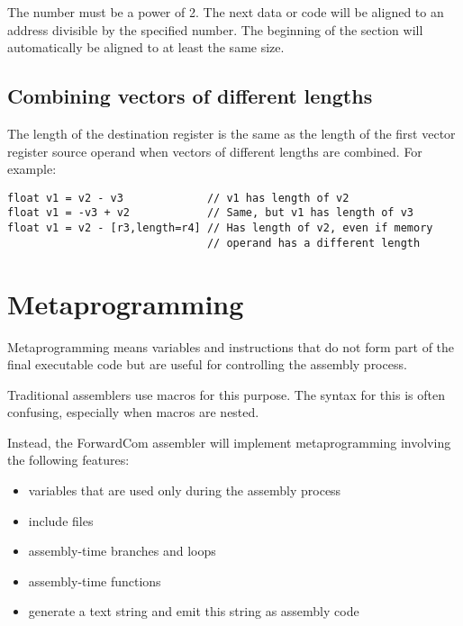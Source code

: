 \documentclass[forwardcom.tex]{subfiles}
\begin{document}
The number must be a power of 2. The next data or code will be aligned to an address divisible by the specified number. The beginning of the section will automatically be aligned to at least the same size.
\vspace{2mm}


\subsection{Combining vectors of different lengths} \label{vectorsDifferentLengths}

The length of the destination register is the same as the length of the first vector register source operand when vectors of different lengths are combined. For example:
\vspace{2mm}

\begin{lstlisting}[frame=single]
float v1 = v2 - v3             // v1 has length of v2
float v1 = -v3 + v2            // Same, but v1 has length of v3
float v1 = v2 - [r3,length=r4] // Has length of v2, even if memory
                               // operand has a different length
\end{lstlisting}
\vspace{4mm}


\section{Metaprogramming} \label{assemblyMetaprogramming}
Metaprogramming means variables and instructions that do not form part of the final executable code but 
are useful for controlling the assembly process.
\vspace{2mm}

Traditional assemblers use macros for this purpose. The syntax for this is often confusing, especially when macros are nested.
\vspace{2mm}

Instead, the ForwardCom assembler will implement metaprogramming involving the following features:

\begin{itemize}
\item variables that are used only during the assembly process
\item include files
\item assembly-time branches and loops
\item assembly-time functions
\item generate a text string and emit this string as assembly code
\end{itemize}
\end{document}
